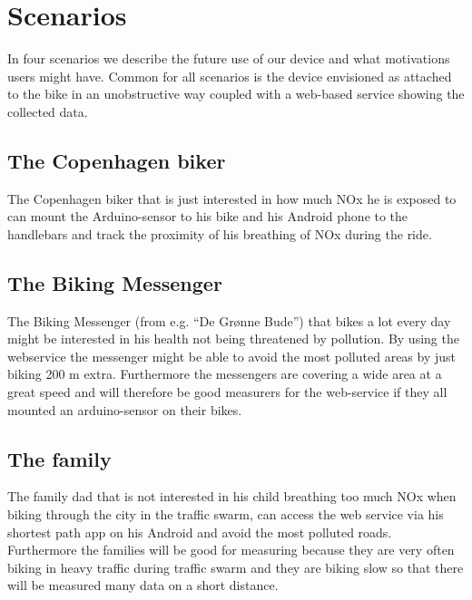 \documentclass{ubicomp2011}
\begin{document}

\section{Scenarios}


In four scenarios we describe the future use of our device and what motivations users might have. Common for all scenarios is the device envisioned as attached to the bike in an unobstructive way coupled with a web-based service showing the collected data.
\subsection{The Copenhagen biker}
The Copenhagen biker that is just interested in how much NOx he is exposed to can mount the Arduino-sensor to his bike and his Android phone to the handlebars and track the proximity of his breathing of NOx during the ride. 

\subsection{The Biking Messenger}
The Biking Messenger (from e.g. “De Grønne Bude”) that bikes a lot every day might be interested in his health not being threatened by pollution. By using the webservice the messenger might be able to avoid the most polluted areas by just biking 200 m extra. Furthermore the messengers are covering a wide area at a great speed and will therefore be good measurers for the web-service if they all mounted an arduino-sensor on their bikes.

\subsection{The family}
The family dad that is not interested in his child breathing too much NOx when biking through the city in the traffic swarm, can access the web service via his shortest path app on his Android and avoid the most polluted roads. Furthermore the families will be good for measuring because they are very often biking in heavy traffic during traffic swarm and they are biking slow so that there will be measured many data on a short distance.
\end{document}
